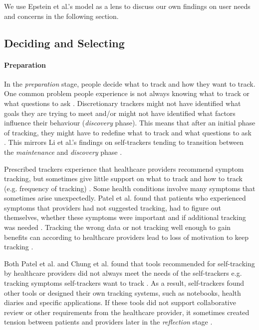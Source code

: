 We use Epstein et al.'s model as a lens to discuss our own findings on user needs and concerns in the following section. 

\subsection{Deciding and Selecting}
\paragraph{Preparation}
In the \textit{preparation} stage, people decide what to track and how they want to track. One common problem people experience is not always knowing what to track or what questions to ask \citep{Li2011, Choe2014, Chung2015, Patel2012}. Discretionary trackers might not have identified what goals they are trying to meet and/or might not have identified what factors influence their behaviour (\textit{discovery} phase). This means that after an initial phase of tracking, they might have to redefine what to track and what questions to ask \citep{Choe2014}. This mirrors  Li et al.'s findings on self-trackers tending to transition between the \textit{maintenance} and \textit{discovery} phase \citep{Li2011}. 

Prescribed trackers experience that healthcare providers recommend symptom tracking, but sometimes give little support on what to track and how to track (e.g. frequency of tracking) \citep{Patel2012}. Some health conditions involve many symptoms that sometimes arise unexpectedly. Patel et al. found that patients who experienced symptoms that providers had not suggested tracking, had to figure out themselves, whether these symptoms were important and if additional tracking was needed \citep{Patel2012}. Tracking the wrong data or not tracking well enough to gain benefits can according to healthcare providers lead to loss of motivation to keep tracking \citep{Chung2015}.  

Both Patel et al. and Chung et al. found that tools recommended for self-tracking by healthcare providers did not always meet the needs of the self-trackers e.g. tracking symptoms self-trackers want to track \citep{Patel2012, Chung2016}. As a result, self-trackers found other tools or designed their own tracking systems, such as notebooks, health diaries and specific applications. If these tools did not support collaborative review or other requirements from the healthcare provider, it sometimes created tension between patients and providers later in the \textit{reflection} stage \citep{Chung2016}. 

